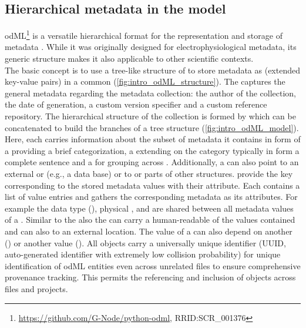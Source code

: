 \subsection{Hierarchical metadata in the  model}
\label{sec:odml}

odML\footnote{\url{https://github.com/G-Node/python-odml}, RRID:SCR\_001376} is a versatile hierarchical format for the representation and storage of metadata \citep{Grewe_2011}. While it was originally designed for electrophysiological metadata, its generic structure makes it also applicable to other scientific contexts.\\

The basic concept is to use a tree-like structure of  to store metadata as  (extended key-value pairs) in a common  (\cref{fig:intro_odML_structure}). The  captures the general metadata regarding the metadata collection: the author of the collection, the date of generation, a custom version specifier and a custom reference repository. The hierarchical structure of the collection is formed by  which can be concatenated to build the branches of a tree structure (\cref{fig:intro_odML_model}). Here, each  carries information about the subset of metadata it contains in form of a   providing a brief categorization, a  extending on the category typically in form a complete sentence and a  for grouping across . Additionally, a  can also point to an external  or  (e.g., a data base) or  to or  parts of other  structures.  provide  the key corresponding to the stored metadata values with their  attribute. Each  contains a list of value entries and gathers the corresponding metadata as its  attributes. For example the data type (), physical ,  and  are shared between all metadata values of a . Similar to the  also the  can carry a human-readable  of the values contained and can also  to an external location. The value of a  can also depend on another  () or another  value (). All  objects carry a universally unique identifier (UUID, auto-generated identifier with extremely low collision probability) for unique identification of odML entities even across unrelated files to ensure comprehensive provenance tracking. This permits the referencing and inclusion of  objects across files and projects.\\

